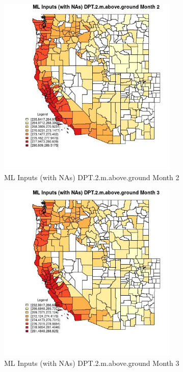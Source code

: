 \begin{figure} 
\centering  
\includegraphics[width=0.77\textwidth]{Code_Outputs/Report_ML_input_PM25_Step4_part_f_de_duplicated_aves_prioritize_24hr_obswNAs_CountyDPT2mabovegroundmedianMonth2.jpg} 
\caption{\label{fig:Report_ML_input_PM25_Step4_part_f_de_duplicated_aves_prioritize_24hr_obswNAsCountyDPT2mabovegroundmedianMonth2}ML Inputs (with NAs) DPT.2.m.above.ground Month 2} 
\end{figure} 
 

\begin{figure} 
\centering  
\includegraphics[width=0.77\textwidth]{Code_Outputs/Report_ML_input_PM25_Step4_part_f_de_duplicated_aves_prioritize_24hr_obswNAs_CountyDPT2mabovegroundmedianMonth3.jpg} 
\caption{\label{fig:Report_ML_input_PM25_Step4_part_f_de_duplicated_aves_prioritize_24hr_obswNAsCountyDPT2mabovegroundmedianMonth3}ML Inputs (with NAs) DPT.2.m.above.ground Month 3} 
\end{figure} 
 

